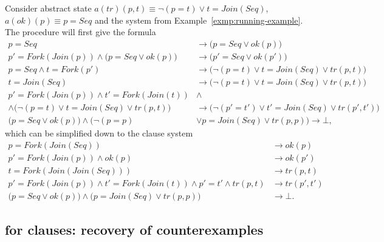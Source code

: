 \begin{example}
Consider abstract state $a(tr)(p, t) \equiv \neg(p = t) \lor t = Join(Seq)$, $a(ok)(p) \equiv p = Seq$ and the system from Example~\ref{exmp:running-example}. The procedure \substituteLemmas{} will first give the formula
\begin{align*}
  p = Seq &\rightarrow\big(p = Seq \lor ok(p)\big)&\\
  p' = Fork(Join(p)) \land \big(p = Seq \lor ok(p)\big) &\rightarrow\big(p' = Seq \lor ok(p')\big)&\\
  p = Seq \land t = Fork(p') &\rightarrow\big(\neg(p = t) \lor t = Join(Seq) \lor tr(p, t)\big)&\\
  t = Join(Seq) &\rightarrow\big(\neg(p = t) \lor t = Join(Seq) \lor tr(p, t)\big)&\\
  p' = Fork(Join(p)) \land t' = Fork(Join(t)) &\land&\\
  \land\big(\neg(p = t) \lor t = Join(Seq) \lor tr(p, t)\big)
  &\rightarrow\big(\neg(p' = t') \lor t' = Join(Seq) \lor tr(p', t')\big)&\\
  \big(p = Seq \lor ok(p)\big) \land \big(\neg(p = p)  &\lor p = Join(Seq) \lor tr(p, p)\big) \rightarrow \bot,
  \end{align*}
which can be simplified down to the clause system
\begin{align*}
  p = Fork(Join(Seq)) &\rightarrow ok(p)\\
  p' = Fork(Join(p)) \land ok(p) &\rightarrow ok(p')\\
  t = Fork(Join(Join(Seq))) &\rightarrow tr(p, t)\\
  p' = Fork(Join(p)) \land t' = Fork(Join(t)) \land p' = t'\land tr(p, t) &\rightarrow tr(p', t')\\
  \big(p = Seq \lor ok(p)\big) \land \big(p = Join(Seq) \lor tr(p, p)\big) &\rightarrow \bot.
  \end{align*}
\end{example}

\subsection{\ourCEGAR{} for clauses: recovery of counterexamples}\label{sec:recover-cex}

